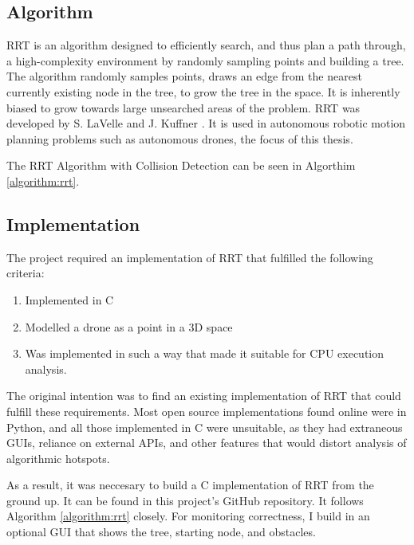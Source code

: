 
\subsection{Algorithm}

    \ac{RRT} is an algorithm designed to efficiently search, and thus plan a path through, a high-complexity environment by randomly sampling points and building a tree. The algorithm randomly samples points, draws an edge from the nearest currently existing node in the tree, to grow the tree in the space. It is inherently biased to grow towards large unsearched areas of the problem. RRT was developed by S. LaVelle \cite{LaValle1998} and J. Kuffner \cite{LaValle2001}. It is used in autonomous robotic motion planning problems such as autonomous drones, the focus of this thesis.

    The RRT Algorithm with Collision Detection can be seen in Algorthim \ref{algorithm:rrt}.
    

\subsection{Implementation}
    
    The project required an implementation of RRT that fulfilled the following criteria:

    \begin{enumerate}
        \item Implemented in C
        \item Modelled a drone as a point in a 3D space
        \item Was implemented in such a way that made it suitable for CPU execution analysis.
    \end{enumerate}

    The original intention was to find an existing implementation of RRT that could fulfill these requirements. Most open source implementations found online were in Python, and all those implemented in C were unsuitable\cite{RoboJackets2019}\cite{Planning2019}\cite{Sourishg2017}\cite{Vss2sn2019}, as they had extraneous \ac{GUI}s, reliance on external \ac{API}s, and other features that would distort analysis of algorithmic hotspots.

    As a result, it was neccesary to build a C implementation of RRT from the ground up. It can be found in this project's GitHub repository. It follows Algorithm \ref{algorithm:rrt} closely. For monitoring correctness, I build in an optional \ac{GUI} that shows the tree, starting node, and obstacles. 

